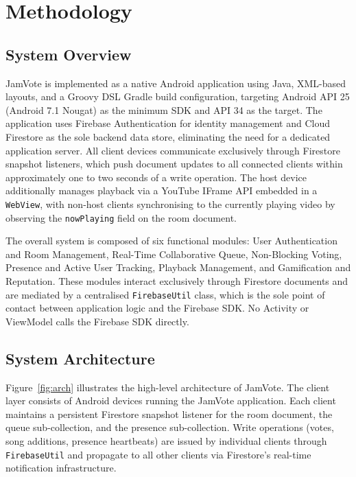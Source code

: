 \documentclass[pdflatex,sn-mathphys-num,iicol]{sn-jnl}
\theoremstyle{thmstyleone}%
\theoremstyle{thmstyletwo}%
\theoremstyle{thmstylethree}%
\begin{document}

\clearpage
\section{Methodology}\label{sec:methodology}

\subsection{System Overview}

JamVote is implemented as a native Android application using Java, XML-based layouts,
and a Groovy DSL Gradle build configuration, targeting Android API 25 (Android 7.1
Nougat) as the minimum SDK and API 34 as the target. The application uses Firebase
Authentication for identity management and Cloud Firestore as the sole backend data
store, eliminating the need for a dedicated application server. All client devices
communicate exclusively through Firestore snapshot listeners, which push document
updates to all connected clients within approximately one to two seconds of a write
operation. The host device additionally manages playback via a YouTube IFrame API
embedded in a \texttt{WebView}, with non-host clients synchronising to the currently
playing video by observing the \texttt{nowPlaying} field on the room document.

The overall system is composed of six functional modules: User Authentication and Room
Management, Real-Time Collaborative Queue, Non-Blocking Voting, Presence and Active
User Tracking, Playback Management, and Gamification and Reputation. These modules
interact exclusively through Firestore documents and are mediated by a centralised
\texttt{FirebaseUtil} class, which is the sole point of contact between application
logic and the Firebase SDK. No Activity or ViewModel calls the Firebase SDK directly.

\subsection{System Architecture}

Figure~\ref{fig:arch} illustrates the high-level architecture of JamVote. The client
layer consists of Android devices running the JamVote application. Each client maintains
a persistent Firestore snapshot listener for the room document, the queue
sub-collection, and the presence sub-collection. Write operations (votes, song
additions, presence heartbeats) are issued by individual clients through
\texttt{FirebaseUtil} and propagate to all other clients via Firestore's real-time
notification infrastructure.
\end{document}
